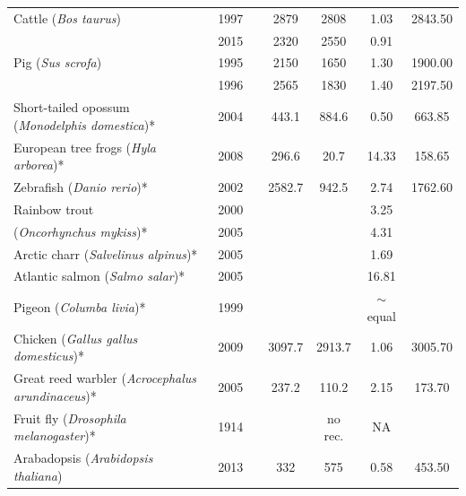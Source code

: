 {\begin{table}[p]
\begin{tabular}{|P{3.2cm}|c|c|c|c|c|c|}
\rule{0pt}{2ex} Cattle (\textit{Bos taurus}) & 1997 & \citet{Kappes1997} & 2879 & 2808 & 1.03 & 2843.50 \\
        & 2015 & \citet{Ma2015} & 2320 & 2550 & 0.91 &  \\ \hline
\rule{0pt}{2ex} Pig (\textit{Sus scrofa}) & 1995 & \citet{Archibald1995} & 2150 & 1650 & 1.30 & 1900.00 \\
     & 1996 & \citet{Marklund1996} & 2565 & 1830 & 1.40 & 2197.50 \\ \hline
\rule{0pt}{2ex} Short-tailed opossum (\textit{Monodelphis domestica})* & 2004 & \citet{Samollow2004} & 443.1 & 884.6 & 0.50 & 663.85 \\ \hline
\rule{0pt}{2ex} European tree frogs (\textit{Hyla arborea})* & 2008 & \citet{Berset-Brandli2008} & 296.6 & 20.7 & 14.33 & 158.65 \\ \hline
\rule{0pt}{2ex} Zebrafish (\textit{Danio rerio})* & 2002 & \citet{Singer2002} & 2582.7 & 942.5 & 2.74 & 1762.60 \\ \hline
\rule{0pt}{2ex} Rainbow trout  & 2000 & \citet{Sakamoto2000} &  &  & 3.25 &  \\
(\textit{Oncorhynchus mykiss})* & 2005 & \citet{Danzmann2005} &  &  & 4.31 &  \\ \hline
\rule{0pt}{2ex} Arctic charr (\textit{Salvelinus alpinus})* & 2005 & \citet{Danzmann2005} &  &  & 1.69 &  \\ \hline
\rule{0pt}{2ex} Atlantic salmon (\textit{Salmo salar})* & 2005 & \citet{Danzmann2005} &  &  & 16.81 &  \\ \hline
\rule{0pt}{2ex} Pigeon (\textit{Columba livia})* & 1999 & \citet{Pigozzi1999} &  &  & $\sim$equal &  \\ \hline
\rule{0pt}{2ex} Chicken (\textit{Gallus gallus domesticus})* & 2009 & \citet{Groenen2009} & 3097.7 & 2913.7 & 1.06 & 3005.70 \\ \hline
\rule{0pt}{2ex} Great reed warbler (\textit{Acrocephalus arundinaceus})* & 2005 & \citet{Hansson2005} & 237.2 & 110.2 & 2.15 & 173.70 \\ \hline
\rule{0pt}{2ex} Fruit fly (\textit{Drosophila melanogaster})* & 1914 & \citet{Morgan1914} &  & no rec. & NA &  \\ \hline
\rule{0pt}{2ex} Arabadopsis (\textit{Arabidopsis thaliana}) & 2013 & \citet{Basu-Roy2013} & 332 & 575 & 0.58 & 453.50 \\
    \hline \end{tabular}
\end{table}
\clearpage}

